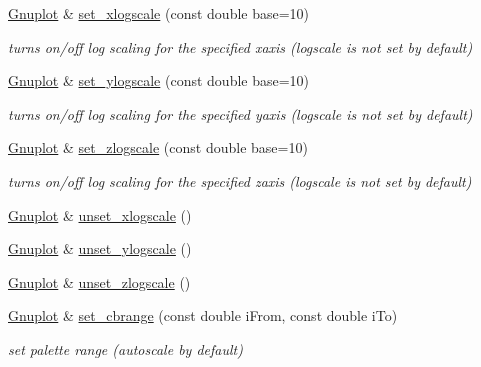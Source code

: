 \begin{DoxyCompactItemize}
\hyperlink{classGnuplot}{Gnuplot} \& \hyperlink{classGnuplot_aff546fad227d93babeb5d2cc9f047b89}{set\+\_\+xlogscale} (const double base=10)
\begin{DoxyCompactList}\small\item\em turns on/off log scaling for the specified xaxis (logscale is not set by default) \end{DoxyCompactList}\item 
\mbox{\label{classGnuplot_a201a802d2f27fece0d39809c4eb3bce0}} 
\hyperlink{classGnuplot}{Gnuplot} \& \hyperlink{classGnuplot_a201a802d2f27fece0d39809c4eb3bce0}{set\+\_\+ylogscale} (const double base=10)
\begin{DoxyCompactList}\small\item\em turns on/off log scaling for the specified yaxis (logscale is not set by default) \end{DoxyCompactList}\item 
\mbox{\label{classGnuplot_a1da3838163b0dbde8809b55c5b5c56b1}} 
\hyperlink{classGnuplot}{Gnuplot} \& \hyperlink{classGnuplot_a1da3838163b0dbde8809b55c5b5c56b1}{set\+\_\+zlogscale} (const double base=10)
\begin{DoxyCompactList}\small\item\em turns on/off log scaling for the specified zaxis (logscale is not set by default) \end{DoxyCompactList}\item 
\hyperlink{classGnuplot}{Gnuplot} \& \hyperlink{classGnuplot_a7b178184260f1498cd0c11a197ea0ac2}{unset\+\_\+xlogscale} ()
\item 
\hyperlink{classGnuplot}{Gnuplot} \& \hyperlink{classGnuplot_a9217543dd49c4802b1194d42c5e10b6d}{unset\+\_\+ylogscale} ()
\item 
\hyperlink{classGnuplot}{Gnuplot} \& \hyperlink{classGnuplot_afa67f022ca344593b054d7f2e3406c7e}{unset\+\_\+zlogscale} ()
\item 
\mbox{\label{classGnuplot_a2228f5ab4cce2da463fc90383076a598}} 
\hyperlink{classGnuplot}{Gnuplot} \& \hyperlink{classGnuplot_a2228f5ab4cce2da463fc90383076a598}{set\+\_\+cbrange} (const double i\+From, const double i\+To)
\begin{DoxyCompactList}\small\item\em set palette range (autoscale by default) \end{DoxyCompactList}\item 

\end{DoxyCompactItemize}
